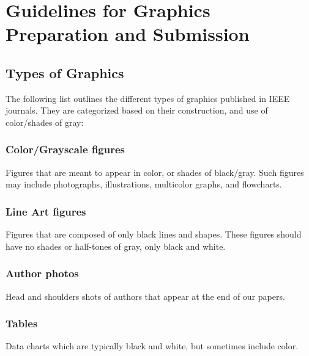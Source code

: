 \documentclass[journal,twoside,web]{ieeecolor}
\begin{document}
\section{Guidelines for Graphics Preparation and Submission}
\label{sec:guidelines}

\subsection{Types of Graphics}
The following list outlines the different types of graphics published in 
IEEE journals. They are categorized based on their construction, and use of 
color/shades of gray:

\subsubsection{Color/Grayscale figures}
{Figures that are meant to appear in color, or shades of black/gray. Such 
figures may include photographs, illustrations, multicolor graphs, and 
flowcharts.}

\subsubsection{Line Art figures}
{Figures that are composed of only black lines and shapes. These figures 
should have no shades or half-tones of gray, only black and white.}

\subsubsection{Author photos}
{Head and shoulders shots of authors that appear at the end of our papers. }

\subsubsection{Tables}
{Data charts which are typically black and white, but sometimes include 
color.}
\end{document}
